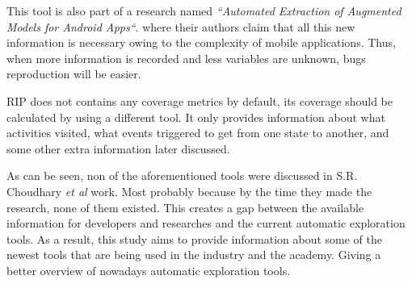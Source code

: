 This tool is also part of a research named \textit{``Automated Extraction of Augmented Models for Android Apps``}. where their authors claim that all this new information is necessary owing to the complexity of mobile applications. Thus, when more information is recorded and less variables are unknown, bugs reproduction will be easier.

RIP does not contains any coverage metrics by default, its coverage should be calculated by using a different tool. It only provides information about what activities visited, what events triggered to get from one state to another, and some other extra information later discussed.

As can be seen, non of the aforementioned tools were discussed in S.R. Choudhary \textit{et al} \cite{Choudhary} work. Most probably because by the time they made the research, none of them existed. This creates a gap between the available information for developers and researches and the current automatic exploration tools. As a result, this study aims to provide information about some of the newest tools that are being used in the industry and the academy. Giving a better overview of nowadays automatic exploration tools.
